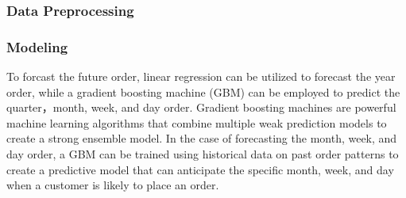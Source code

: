 \documentclass[
  11pt,
]{article}
\newenvironment{Shaded}{\begin{snugshade}}{\end{snugshade}}
\newcommand{\AttributeTok}[1]{\textcolor[rgb]{0.40,0.45,0.13}{#1}}
\newcommand{\CommentTok}[1]{\textcolor[rgb]{0.37,0.37,0.37}{#1}}
\newcommand{\FunctionTok}[1]{\textcolor[rgb]{0.28,0.35,0.67}{#1}}
\newcommand{\NormalTok}[1]{\textcolor[rgb]{0.00,0.23,0.31}{#1}}
\newcommand{\OtherTok}[1]{\textcolor[rgb]{0.00,0.23,0.31}{#1}}
\newcommand{\SpecialCharTok}[1]{\textcolor[rgb]{0.37,0.37,0.37}{#1}}
\newcommand{\StringTok}[1]{\textcolor[rgb]{0.13,0.47,0.30}{#1}}
\begin{document}
\hypertarget{data-preprocessing}{%
\subsubsection{Data Preprocessing}\label{data-preprocessing}}

\begin{Shaded}
\end{Shaded}

\hypertarget{modeling}{%
\subsubsection{Modeling}\label{modeling}}

To forcast the future order, linear regression can be utilized to
forecast the year order, while a gradient boosting machine (GBM) can be
employed to predict the quarter，month, week, and day order. Gradient
boosting machines are powerful machine learning algorithms that combine
multiple weak prediction models to create a strong ensemble model. In
the case of forecasting the month, week, and day order, a GBM can be
trained using historical data on past order patterns to create a
predictive model that can anticipate the specific month, week, and day
when a customer is likely to place an order.
\end{document}
